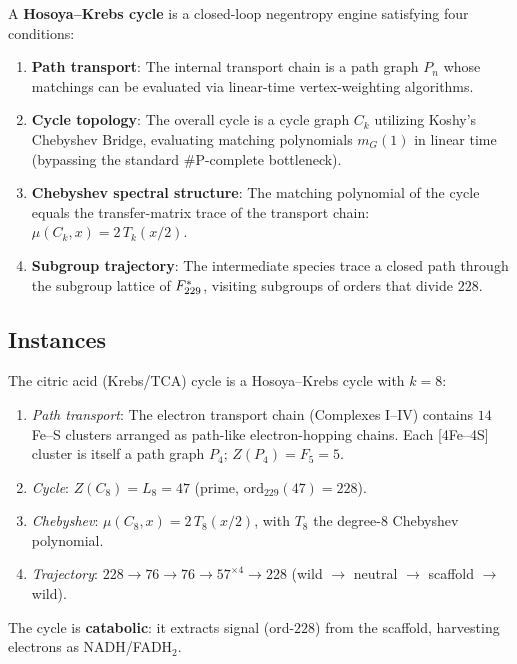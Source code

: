 \begin{definition}\label{def:hl_cycle}
A \textbf{Hosoya--Krebs cycle} is a closed-loop negentropy engine satisfying four conditions:
\begin{enumerate}
    \item \textbf{Path transport}: The internal transport chain is a path graph $P_n$ whose matchings can be evaluated via linear-time vertex-weighting algorithms.
    \item \textbf{Cycle topology}: The overall cycle is a cycle graph $C_k$ utilizing Koshy's Chebyshev Bridge, evaluating matching polynomials $m_G(1)$ in linear time (bypassing the standard \#P-complete bottleneck).
    \item \textbf{Chebyshev spectral structure}: The matching polynomial of the cycle equals the transfer-matrix trace of the transport chain: $\mu(C_k, x) = 2\,T_k(x/2)$.
    \item \textbf{Subgroup trajectory}: The intermediate species trace a closed path through the subgroup lattice of\/ $F_{229}^*$, visiting subgroups of orders that divide $228$.
\end{enumerate}
\end{definition}

\subsection{Instances}

\begin{result}\label{res:krebs_hl}
The citric acid (Krebs/TCA) cycle is a Hosoya--Krebs cycle with $k = 8$:
\begin{enumerate}[noitemsep]
    \item[(HL1)] \emph{Path transport}: The electron transport chain (Complexes I--IV) contains $14$ Fe--S clusters arranged as path-like electron-hopping chains. Each [4Fe--4S] cluster is itself a path graph $P_4$; $Z(P_4) = F_5 = 5$.
    \item[(HL2)] \emph{Cycle}: $Z(C_8) = L_8 = 47$ (prime, $\mathrm{ord}_{229}(47) = 228$).
    \item[(HL3)] \emph{Chebyshev}: $\mu(C_8, x) = 2\,T_8(x/2)$, with $T_8$ the degree-$8$ Chebyshev polynomial.
    \item[(HL4)] \emph{Trajectory}: $228 \to 76 \to 76 \to 57^{\times 4} \to 228$ (wild $\to$ neutral $\to$ scaffold $\to$ wild).
\end{enumerate}
The cycle is \textbf{catabolic}: it extracts signal (ord-$228$) from the scaffold, harvesting electrons as NADH/FADH$_2$.
\end{result}

